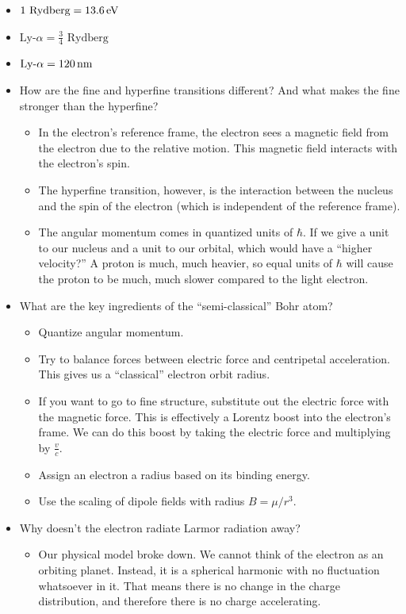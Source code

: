 \documentclass{article}
\newcommand{\unit}[1]{{\,\rm #1}}
\newcommand{\ev}{\unit{eV}}
\newcommand{\nm}{\unit{nm}}
\begin{document}
\begin{itemize}
    \item $1 \text{ Rydberg} = 13.6 \ev$
    \item $\text{Ly-}\alpha = \frac{3}{4} \text{ Rydberg}$
    \item $\text{Ly-}\alpha = 120 \nm$
    \item How are the fine and hyperfine transitions different? And what makes the fine stronger than the hyperfine?
    \begin{itemize}
        \item In the electron's reference frame, the electron sees a magnetic field from the electron due to the relative motion. This magnetic field interacts with the electron's spin. 
        \item The hyperfine transition, however, is the interaction between the nucleus and the spin of the electron (which is independent of the reference frame). 
        \item The angular momentum comes in quantized units of $\hbar$. If we give a unit to our nucleus and a unit to our orbital, which would have a ``higher velocity?'' A proton is much, much heavier, so equal units of $\hbar$ will cause the proton to be much, much slower compared to the light electron.
    \end{itemize}
    
    \item What are the key ingredients of the ``semi-classical'' Bohr atom?
    \begin{itemize}
        \item Quantize angular momentum.
        \item Try to balance forces between electric force and centripetal acceleration. This gives us a ``classical'' electron orbit radius. 
        \item If you want to go to fine structure, substitute out the electric force with the magnetic force. This is effectively a Lorentz boost into the electron's frame. We can do this boost by taking the electric force and multiplying by $\frac{v}{c}$.
        \item Assign an electron a radius based on its binding energy. 
        \item Use the scaling of dipole fields with radius $B = \mu/r^3$. 
    \end{itemize}
    
    \item Why doesn't the electron radiate Larmor radiation away?
    \begin{itemize}
        \item Our physical model broke down. We cannot think of the electron as an orbiting planet. Instead, it is a spherical harmonic with no fluctuation whatsoever in it. That means there is no change in the charge distribution, and therefore there is no charge accelerating. 
        

\end{itemize}
\end{itemize}
\end{document}
